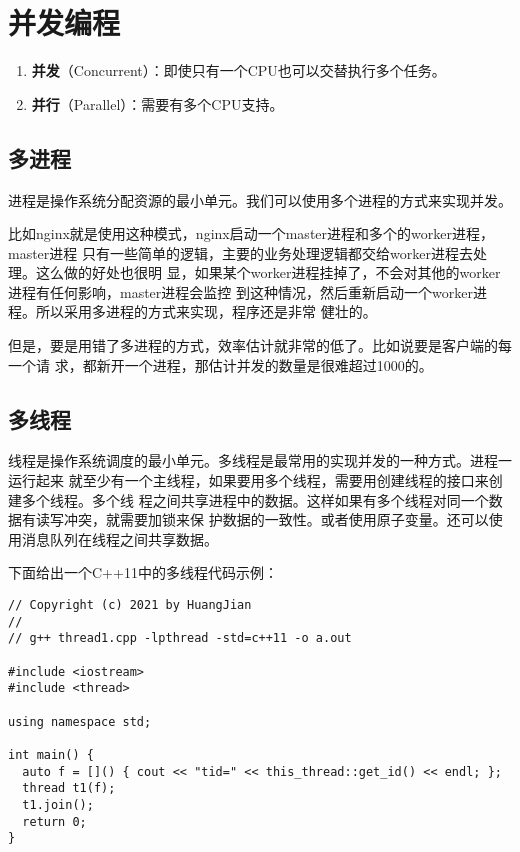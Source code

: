 \chapter{并发编程}

\begin{enumerate}
  \item \textbf{并发}（Concurrent）：即使只有一个CPU也可以交替执行多个任务。
  \item \textbf{并行}（Parallel）：需要有多个CPU支持。
\end{enumerate}

\section{多进程}

进程是操作系统分配资源的最小单元。我们可以使用多个进程的方式来实现并发。

比如nginx就是使用这种模式，nginx启动一个master进程和多个的worker进程，master进程
只有一些简单的逻辑，主要的业务处理逻辑都交给worker进程去处理。这么做的好处也很明
显，如果某个worker进程挂掉了，不会对其他的worker进程有任何影响，master进程会监控
到这种情况，然后重新启动一个worker进程。所以采用多进程的方式来实现，程序还是非常
健壮的。

但是，要是用错了多进程的方式，效率估计就非常的低了。比如说要是客户端的每一个请
求，都新开一个进程，那估计并发的数量是很难超过1000的。

\section{多线程}

线程是操作系统调度的最小单元。多线程是最常用的实现并发的一种方式。进程一运行起来
就至少有一个主线程，如果要用多个线程，需要用创建线程的接口来创建多个线程。多个线
程之间共享进程中的数据。这样如果有多个线程对同一个数据有读写冲突，就需要加锁来保
护数据的一致性。或者使用原子变量。还可以使用消息队列在线程之间共享数据。

下面给出一个C++11中的多线程代码示例：

\begin{verbatim}
// Copyright (c) 2021 by HuangJian
//
// g++ thread1.cpp -lpthread -std=c++11 -o a.out

#include <iostream>
#include <thread>

using namespace std;

int main() {
  auto f = []() { cout << "tid=" << this_thread::get_id() << endl; };
  thread t1(f);
  t1.join();
  return 0;
}
\end{verbatim}

